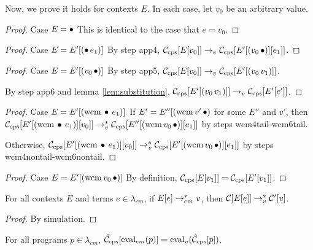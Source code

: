 Now, we prove it holds for contexts $E$. In each case, let $v_0$ be an arbitrary value.
\begin{proof}{Case $E=\bullet$}
This is identical to the case that $e=v_0$.
\end{proof}

\begin{proof}{Case $E=E'[(\bullet\,e_1)]$}
By step app4, $\mathcal{C}_{\mathrm{cps}}[E[v_0]]\rightarrow_v\mathcal{C}_{\mathrm{cps}}[E'[(v_0\,\bullet)][e_1]]$.
\end{proof}

\begin{proof}{Case $E=E'[(v_0\,\bullet)]$}
By step app5, $\mathcal{C}_{\mathrm{cps}}[E[v_0]]\rightarrow_v\mathcal{C}_{\mathrm{cps}}[E'[(v_0\,v_1)]]$.

By step app6 and lemma \ref{lem:substitution}, $\mathcal{C}_{\mathrm{cps}}[E'[(v_0\,v_1)]]\rightarrow_v\mathcal{C}_{\mathrm{cps}}[E'[e']]$.
\end{proof}

\begin{proof}{Case $E=E'[(\mathrm{wcm}\,\bullet\,e_1)]$}
If $E'=E''[(\mathrm{wcm}\,v'\,\bullet)$ for some $E''$ and $v'$, then $\mathcal{C}_{\mathrm{cps}}[E'[(\mathrm{wcm}\,\bullet\,e_1)][v_0]]\rightarrow_v^{*}\mathcal{C}_{\mathrm{cps}}[E''[(\mathrm{wcm}\,v_0\,\bullet)][e_1]]$ by steps wcm4tail-wcm6tail.

Otherwise, $\mathcal{C}_{\mathrm{cps}}[E'[(\mathrm{wcm}\,\bullet\,e_1)][v_0]]\rightarrow_v^{*}\mathcal{C}_{\mathrm{cps}}[E'[(\mathrm{wcm}\,v_0\,\bullet)][e_1]]$ by steps wcm4nontail-wcm6nontail.
\end{proof}

\begin{proof}{Case $E=E'[(\mathrm{wcm}\,v_0\,\bullet)]$}
By definition, $\mathcal{C}_{\mathrm{cps}}[E[v_1]]=\mathcal{C}_{\mathrm{cps}}[E'[v_1]]$.
\end{proof}

\begin{corollary}
\label{cor:great}
For all contexts $E$ and terms $e\in\lambda_{cm}$, if $E[e]\rightarrow_{cm}^{*} v$, then $\mathcal{C}[E[e]]\rightarrow_v^{*}\mathcal{C}'[v]$.
\end{corollary}

\begin{proof}
By simulation.
\end{proof}

\begin{theorem}
For all programs $p\in\lambda_{cm}$, $\hat{\mathcal{C}}_{\mathrm{cps}}[\mathrm{eval}_{cm}(p)]=\mathrm{eval}_{v}(\hat{\mathcal{C}}_{\mathrm{cps}}[p])$.
\end{theorem}

